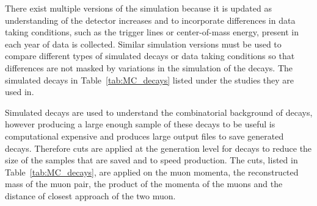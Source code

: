 There exist multiple versions of the simulation because it is updated as understanding of the detector increases and to incorporate differences in data taking conditions, such as the trigger lines or center-of-mass energy, present in each year of data is collected. Similar simulation versions must be used to compare different types of simulated decays or data taking conditions so that differences are not masked by variations in the simulation of the decays. The simulated decays in Table~\ref{tab:MC_decays} listed under the studies they are used in. 

Simulated \bbbarmumux decays are used to understand the combinatorial background of \bsmumu decays, however producing a large enough sample of these decays to be useful is computational expensive and produces large output files to save generated decays. Therefore cuts are applied at the generation level for \bbbarmumux decays to reduce the size of the samples that are saved and to speed production. The cuts, listed in Table~\ref{tab:MC_decays}, are applied on the muon momenta, the reconstructed mass of the muon pair, the product of the momenta of the muons and the distance of closest approach of the two muon. %
  

